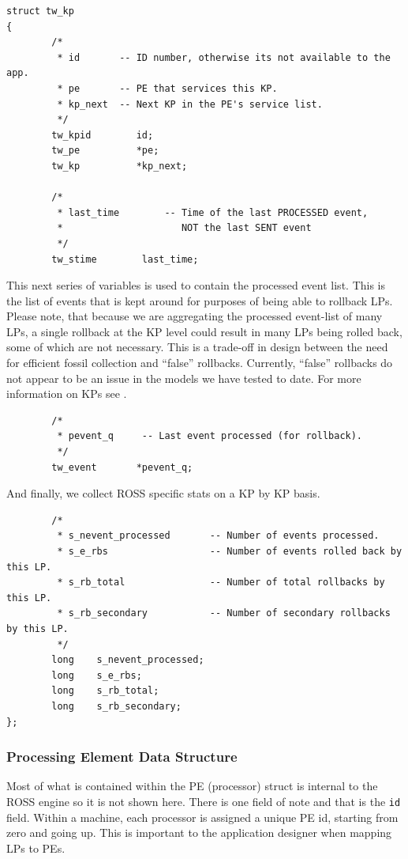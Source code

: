 \documentclass[12pt]{article}
\begin{document}
\begin{verbatim}
struct tw_kp
{
        /*
         * id       -- ID number, otherwise its not available to the app.
         * pe       -- PE that services this KP.
         * kp_next  -- Next KP in the PE's service list.
         */
        tw_kpid        id;
        tw_pe          *pe;
        tw_kp          *kp_next;

        /*
         * last_time        -- Time of the last PROCESSED event, 
         *                     NOT the last SENT event
         */
        tw_stime        last_time;
\end{verbatim}

This next series of variables is used to contain the processed event
list. This is the list of events that is kept around for purposes of
being able to rollback LPs. Please note, that because we are
aggregating the processed event-list of many LPs, a single rollback at
the KP level could result in many LPs being rolled back, some of which
are not necessary.  This is a trade-off in design between the need for
efficient fossil collection and ``false'' rollbacks. Currently,
``false'' rollbacks do not appear to be an issue in the models we have
tested to date. For more information on KPs see
\cite{carothers-pads-2000}.

\begin{verbatim}
        /*
         * pevent_q     -- Last event processed (for rollback).
         */
        tw_event       *pevent_q;
\end{verbatim}

And finally, we collect ROSS specific stats on a KP by KP basis.

\begin{verbatim}
        /*
         * s_nevent_processed       -- Number of events processed.
         * s_e_rbs                  -- Number of events rolled back by this LP.
         * s_rb_total               -- Number of total rollbacks by this LP.
         * s_rb_secondary           -- Number of secondary rollbacks by this LP.
         */
        long    s_nevent_processed;
        long    s_e_rbs;
        long    s_rb_total;
        long    s_rb_secondary;
};
\end{verbatim}
 
\subsubsection{Processing Element Data Structure}
Most of what is contained within the PE (processor) struct is internal
to the ROSS engine so it is not shown here.  There is one field of
note and that is the {\tt id} field.  Within a machine, each processor is
assigned a unique PE id, starting from zero and going up.  This is
important to the application designer when mapping LPs to PEs.
 
\end{document}
